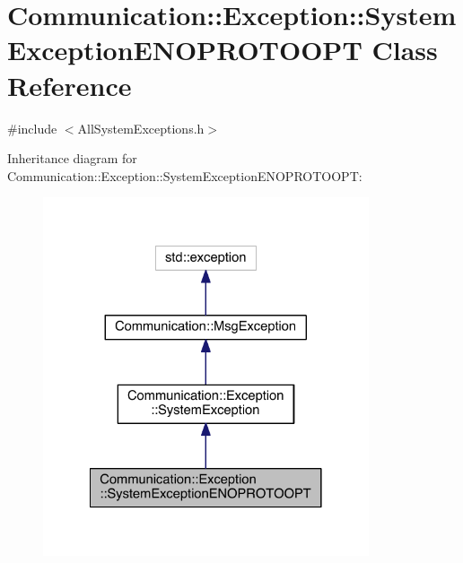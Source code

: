 \hypertarget{class_communication_1_1_exception_1_1_system_exception_e_n_o_p_r_o_t_o_o_p_t}{}\section{Communication\+:\+:Exception\+:\+:System\+Exception\+E\+N\+O\+P\+R\+O\+T\+O\+O\+P\+T Class Reference}
\label{class_communication_1_1_exception_1_1_system_exception_e_n_o_p_r_o_t_o_o_p_t}


{\ttfamily \#include $<$All\+System\+Exceptions.\+h$>$}



Inheritance diagram for Communication\+:\+:Exception\+:\+:System\+Exception\+E\+N\+O\+P\+R\+O\+T\+O\+O\+P\+T\+:\nopagebreak
\begin{figure}[H]
\begin{center}
\leavevmode
\includegraphics[width=272pt]{class_communication_1_1_exception_1_1_system_exception_e_n_o_p_r_o_t_o_o_p_t__inherit__graph}
\end{center}
\end{figure}


